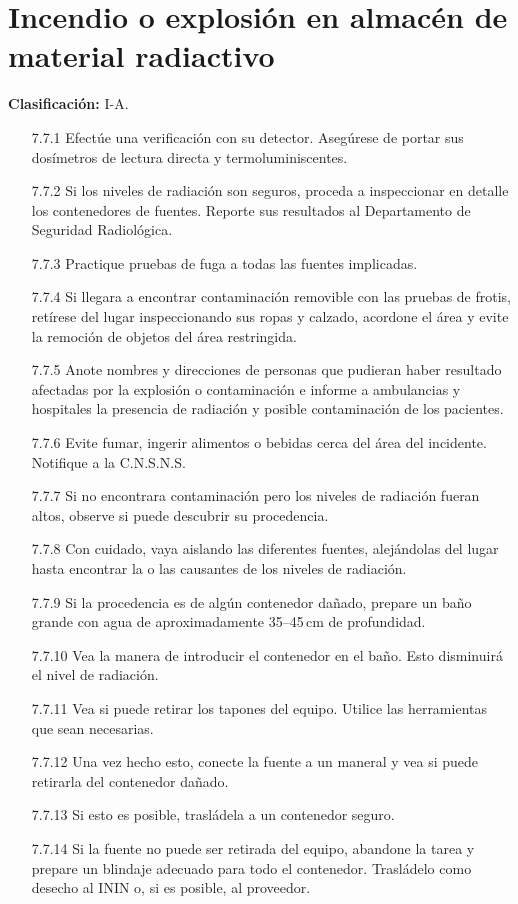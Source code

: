 \section{Incendio o explosión en almacén de material radiactivo}

\textbf{Clasificación:} I-A.
\begin{enumerate}
  \item[7.7.1] Efectúe una verificación con su detector. Asegúrese de portar sus dosímetros de lectura directa y termoluminiscentes.
  \item[7.7.2] Si los niveles de radiación son seguros, proceda a inspeccionar en detalle los contenedores de fuentes. Reporte sus resultados al Departamento de Seguridad Radiológica.
  \item[7.7.3] Practique pruebas de fuga a todas las fuentes implicadas.
  \item[7.7.4] Si llegara a encontrar contaminación removible con las pruebas de frotis, retírese del lugar inspeccionando sus ropas y calzado, acordone el área y evite la remoción de objetos del área restringida.
  \item[7.7.5] Anote nombres y direcciones de personas que pudieran haber resultado afectadas por la explosión o contaminación e informe a ambulancias y hospitales la presencia de radiación y posible contaminación de los pacientes.
  \item[7.7.6] Evite fumar, ingerir alimentos o bebidas cerca del área del incidente. Notifique a la C.N.S.N.S.
  \item[7.7.7] Si no encontrara contaminación pero los niveles de radiación fueran altos, observe si puede descubrir su procedencia.
  \item[7.7.8] Con cuidado, vaya aislando las diferentes fuentes, alejándolas del lugar hasta encontrar la o las causantes de los niveles de radiación.
  \item[7.7.9] Si la procedencia es de algún contenedor dañado, prepare un baño grande con agua de aproximadamente 35--45\,cm de profundidad.
  \item[7.7.10] Vea la manera de introducir el contenedor en el baño. Esto disminuirá el nivel de radiación.
  \item[7.7.11] Vea si puede retirar los tapones del equipo. Utilice las herramientas que sean necesarias.
  \item[7.7.12] Una vez hecho esto, conecte la fuente a un maneral y vea si puede retirarla del contenedor dañado.
  \item[7.7.13] Si esto es posible, trasládela a un contenedor seguro.
  \item[7.7.14] Si la fuente no puede ser retirada del equipo, abandone la tarea y prepare un blindaje adecuado para todo el contenedor. Trasládelo como desecho al ININ o, si es posible, al proveedor.
\end{enumerate}

